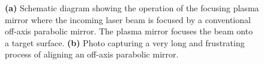 \begin{figure}[h!]
	\centering
	\hspace{5mm}
	\caption{\textbf{(a)} Schematic diagram showing the operation of the focusing plasma mirror where the incoming laser beam is focused by a conventional off-axis parabolic mirror. The plasma mirror focuses the beam onto a target surface. \textbf{(b)} Photo capturing a very long and frustrating process of aligning an off-axis parabolic mirror.}
	\label{}
\end{figure}
